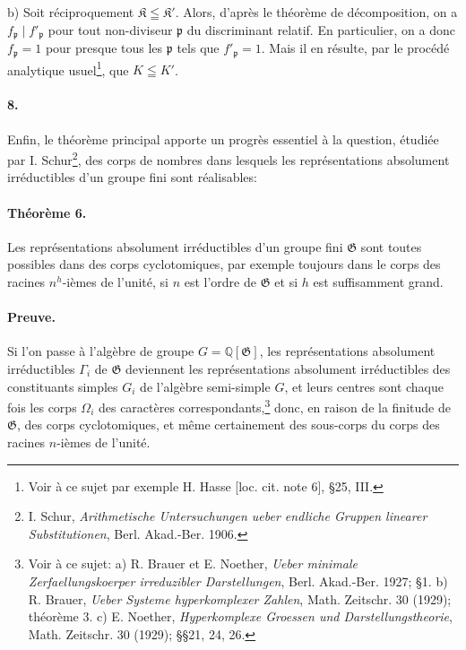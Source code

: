 b) Soit réciproquement \(\mathfrak K\leqq\mathfrak K'\). Alors, d'après le théorème de décomposition, on a \(f_{\mathfrak p}\mid f'_{\mathfrak p}\) pour tout non-diviseur \(\mathfrak p\) du discriminant relatif. En particulier, on a donc \(f_{\mathfrak p}=1\) pour presque tous les \(\mathfrak p\) tels que \(f'_{\mathfrak p}=1\). Mais il en résulte, par le procédé analytique usuel\footnote{Voir à ce sujet par exemple H. Hasse [loc. cit. note 6], \S 25, III.}, que \(K\leqq K'\).

\paragraph{8.}
Enfin, le théorème principal apporte un progrès essentiel à la question, étudiée par I. Schur\footnote{I. Schur, \emph{Arithmetische Untersuchungen ueber endliche Gruppen linearer Substitutionen}, Berl. Akad.-Ber. 1906.}, des corps de nombres dans lesquels les représentations absolument irréductibles d'un groupe fini sont réalisables:

\paragraph{Théorème 6.}
Les représentations absolument irréductibles d'un groupe fini \(\mathfrak G\) sont toutes possibles dans des corps cyclotomiques, par exemple toujours dans le corps des racines \(n^h\)-ièmes de l'unité, si \(n\) est l'ordre de \(\mathfrak G\) et si \(h\) est suffisamment grand.

\paragraph{Preuve.}
Si l'on passe à l'algèbre de groupe \(G=\mathbb Q[\mathfrak G]\), les représentations absolument irréductibles \(\Gamma_i\) de \(\mathfrak G\) deviennent les représentations absolument irréductibles des constituants simples \(G_i\) de l'algèbre semi-simple \(G\), et leurs centres sont chaque fois les corps \(\Omega_i\) des caractères correspondants,\footnote{Voir à ce sujet: a) R. Brauer et E. Noether, \emph{Ueber minimale Zerfaellungskoerper irreduzibler Darstellungen}, Berl. Akad.-Ber. 1927; \S 1. b) R. Brauer, \emph{Ueber Systeme hyperkomplexer Zahlen}, Math. Zeitschr. 30 (1929); théorème 3. c) E. Noether, \emph{Hyperkomplexe Groessen und Darstellungstheorie}, Math. Zeitschr. 30 (1929); \S\S 21, 24, 26.} donc, en raison de la finitude de \(\mathfrak G\), des corps cyclotomiques, et même certainement des sous-corps du corps des racines \(n\)-ièmes de l'unité.

